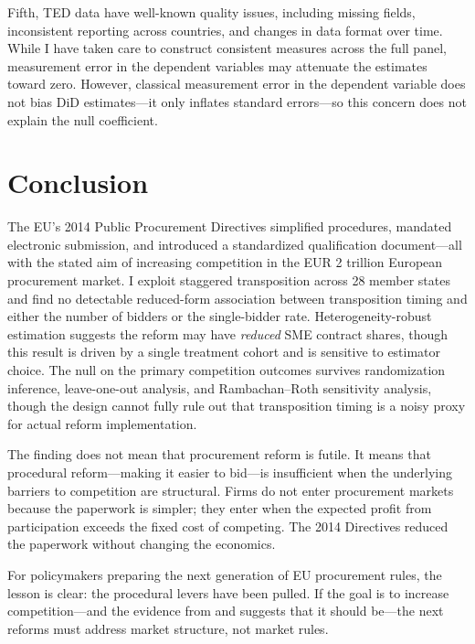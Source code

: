 \documentclass[12pt]{article}
\begin{document}
Fifth, TED data have well-known quality issues, including missing fields, inconsistent reporting across countries, and changes in data format over time. While I have taken care to construct consistent measures across the full panel, measurement error in the dependent variables may attenuate the estimates toward zero. However, classical measurement error in the dependent variable does not bias DiD estimates---it only inflates standard errors---so this concern does not explain the null coefficient.


\section{Conclusion}
\label{sec:conclusion}

The EU's 2014 Public Procurement Directives simplified procedures, mandated electronic submission, and introduced a standardized qualification document---all with the stated aim of increasing competition in the EUR 2 trillion European procurement market. I exploit staggered transposition across 28 member states and find no detectable reduced-form association between transposition timing and either the number of bidders or the single-bidder rate. Heterogeneity-robust estimation suggests the reform may have \textit{reduced} SME contract shares, though this result is driven by a single treatment cohort and is sensitive to estimator choice. The null on the primary competition outcomes survives randomization inference, leave-one-out analysis, and Rambachan--Roth sensitivity analysis, though the design cannot fully rule out that transposition timing is a noisy proxy for actual reform implementation.

The finding does not mean that procurement reform is futile. It means that procedural reform---making it easier to bid---is insufficient when the underlying barriers to competition are structural. Firms do not enter procurement markets because the paperwork is simpler; they enter when the expected profit from participation exceeds the fixed cost of competing. The 2014 Directives reduced the paperwork without changing the economics.

For policymakers preparing the next generation of EU procurement rules, the lesson is clear: the procedural levers have been pulled. If the goal is to increase competition---and the evidence from \citet{bulow1996auctions} and \citet{klemperer2002competition} suggests that it should be---the next reforms must address market structure, not market rules.
\end{document}
